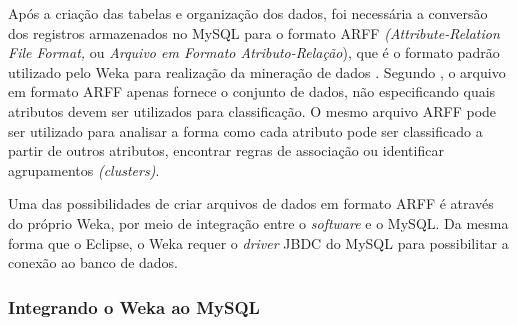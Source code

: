 Após a criação das tabelas e organização dos dados, foi necessária a conversão dos registros armazenados no MySQL para o formato ARFF \textit{(Attribute-Relation File Format,} ou \textit{Arquivo em Formato Atributo-Relação}), que é o formato padrão utilizado pelo Weka para realização da mineração de dados \citep{witten2005}. Segundo \citet{witten2005}, o arquivo em formato ARFF apenas fornece o conjunto de dados, não especificando quais atributos devem ser utilizados para classificação. O mesmo arquivo ARFF pode ser utilizado para analisar a forma como cada atributo pode ser classificado a partir de outros atributos, encontrar regras de associação ou identificar agrupamentos \textit{(clusters)}.

 Uma das possibilidades de criar arquivos de dados em formato ARFF é através do próprio Weka, por meio de integração entre o \textit{software} e o MySQL. Da mesma forma que o Eclipse, o Weka requer o \textit{driver} JBDC do MySQL para possibilitar a conexão ao banco de dados.

\subsubsection{Integrando o Weka ao MySQL} \label{sub51}

